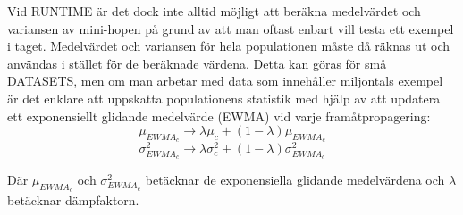 \documentclass[a4paper,11pt,twoside]{article}
\begin{document}
Vid RUNTIME är det dock inte alltid möjligt att beräkna medelvärdet och variansen av mini-hopen på grund av att man oftast enbart vill testa ett exempel i taget. Medelvärdet och variansen för hela populationen måste då räknas ut och användas i stället för de beräknade värdena. Detta kan göras för små DATASETS, men om man arbetar med data som innehåller miljontals exempel är det enklare att uppskatta populationens statistik med hjälp av att updatera ett exponensiellt glidande medelvärde (EWMA) vid varje framåtpropagering: \cite{cs231n} \cite{batchnorm}
\begin{equation}
\mu_{EWMA_c} \to \lambda \mu_c + (1-\lambda)\mu_{EWMA_c}
\end{equation}
\begin{equation}
\sigma^2_{EWMA_c} \to \lambda \sigma^2_c + (1-\lambda)\sigma^2_{EWMA_c}
\end{equation}

Där $\mu_{EWMA_c}$ och $\sigma^2_{EWMA_c}$ betäcknar de exponensiella glidande medelvärdena och $\lambda$ betäcknar dämpfaktorn.
\end{document}
